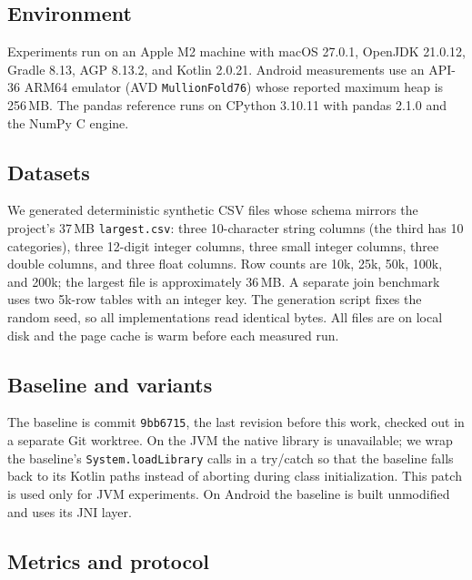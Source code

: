 \documentclass[11pt,a4paper]{article}
\newcommand{\code}[1]{\texttt{#1}}
\begin{document}
\subsection{Environment}

Experiments run on an Apple M2 machine with macOS 27.0.1, OpenJDK 21.0.12, Gradle 8.13, AGP 8.13.2,
and Kotlin 2.0.21.  Android measurements use an API-36 ARM64 emulator (AVD \code{MullionFold76})
whose reported maximum heap is 256\,MB.  The pandas reference runs on CPython 3.10.11 with pandas
2.1.0 and the NumPy C engine.

\subsection{Datasets}

We generated deterministic synthetic CSV files whose schema mirrors the project's 37\,MB
\code{largest.csv}: three 10-character string columns (the third has 10 categories), three 12-digit
integer columns, three small integer columns, three double columns, and three float columns.
Row counts are 10k, 25k, 50k, 100k, and 200k; the largest file is approximately 36\,MB.  A separate
join benchmark uses two 5k-row tables with an integer key.  The generation script fixes the random
seed, so all implementations read identical bytes.  All files are on local disk and the page cache
is warm before each measured run.

\subsection{Baseline and variants}

The baseline is commit \code{9bb6715}, the last revision before this work, checked out in a separate
Git worktree.  On the JVM the native library is unavailable; we wrap the baseline's
\code{System.loadLibrary} calls in a try/catch so that the baseline falls back to its Kotlin paths
instead of aborting during class initialization.  This patch is used only for JVM experiments.
On Android the baseline is built unmodified and uses its JNI layer.

\subsection{Metrics and protocol}
\end{document}
